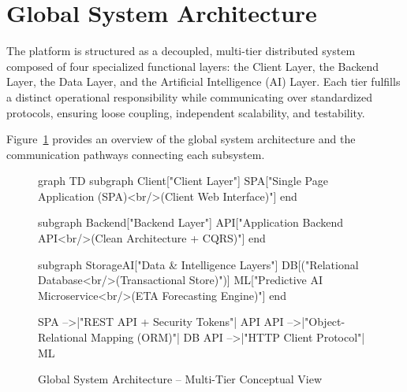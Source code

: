 \section{Global System Architecture}
\label{sec:global_architecture}

The platform is structured as a decoupled, multi-tier distributed system composed of four specialized functional layers: the Client Layer, the Backend Layer, the Data Layer, and the Artificial Intelligence (AI) Layer. Each tier fulfills a distinct operational responsibility while communicating over standardized protocols, ensuring loose coupling, independent scalability, and testability.

Figure~\ref{fig:global_architecture} provides an overview of the global system architecture and the communication pathways connecting each subsystem.

\begin{figure}[H]
  \centering
  \begin{mermaid}[width=0.92\textwidth]
graph TD
    subgraph Client["Client Layer"]
        SPA["Single Page Application (SPA)<br/>(Client Web Interface)"]
    end

    subgraph Backend["Backend Layer"]
        API["Application Backend API<br/>(Clean Architecture + CQRS)"]
    end

    subgraph StorageAI["Data & Intelligence Layers"]
        DB[("Relational Database<br/>(Transactional Store)")]
        ML["Predictive AI Microservice<br/>(ETA Forecasting Engine)"]
    end

    SPA -->|"REST API + Security Tokens"| API
    API -->|"Object-Relational Mapping (ORM)"| DB
    API -->|"HTTP Client Protocol"| ML
  \end{mermaid}
  \caption{Global System Architecture -- Multi-Tier Conceptual View}
  \label{fig:global_architecture}
\end{figure}

